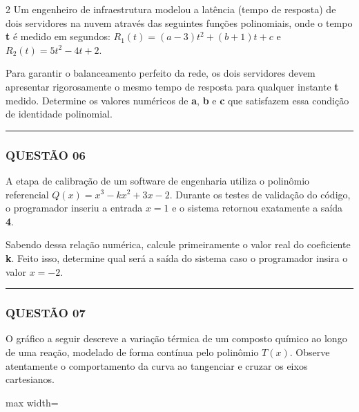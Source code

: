 \documentclass[11pt, a4paper]{article}
\begin{document}
\begin{multicols*}{2}
Um engenheiro de infraestrutura modelou a latência (tempo de resposta) de dois servidores na nuvem através das seguintes funções polinomiais, onde o tempo \textbf{t} é medido em segundos:
$ R_1(t) = (a - 3)t^2 + (b + 1)t + c $ e $ R_2(t) = 5t^2 - 4t + 2 $. 

Para garantir o balanceamento perfeito da rede, os dois servidores devem apresentar rigorosamente o mesmo tempo de resposta para qualquer instante \textbf{t} medido. Determine os valores numéricos de \textbf{a}, \textbf{b} e \textbf{c} que satisfazem essa condição de identidade polinomial.

\vspace{0cm} \noindent\textcolor{CorLinha}{\rule{\linewidth}{0.5pt}} \vspace{-0.2cm}
\subsubsection*{QUESTÃO 06}

A etapa de calibração de um software de engenharia utiliza o polinômio referencial $ Q(x) = x^3 - kx^2 + 3x - 2 $. Durante os testes de validação do código, o programador inseriu a entrada $ x = 1 $ e o sistema retornou exatamente a saída \textbf{4}.

Sabendo dessa relação numérica, calcule primeiramente o valor real do coeficiente \textbf{k}. Feito isso, determine qual será a saída do sistema caso o programador insira o valor $ x = -2 $.

\vspace{0cm} \noindent\textcolor{CorLinha}{\rule{\linewidth}{0.5pt}} \vspace{-0.2cm}
\subsubsection*{QUESTÃO 07}

O gráfico a seguir descreve a variação térmica de um composto químico ao longo de uma reação, modelado de forma contínua pelo polinômio $ T(x) $. Observe atentamente o comportamento da curva ao tangenciar e cruzar os eixos cartesianos.

\begin{center}
\begin{adjustbox}{max width=\linewidth}
\end{adjustbox}
\end{center}
\end{multicols*}
\end{document}

